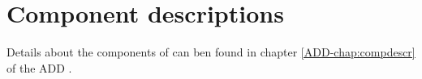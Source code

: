 \chapter{Component descriptions}
\label{chap:componentDesc}

Details about the components of \projectname{} can ben found in chapter \ref{ADD-chap:compdescr} of the ADD \cite{add}.